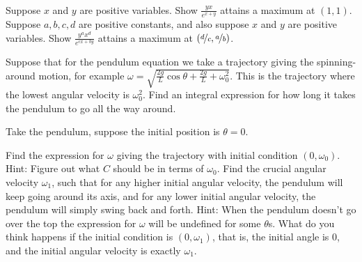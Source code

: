 \begin{exercise}
{\ }
\begin{tasks}
\task Suppose $x$ and $y$ are
positive variables.  Show $\frac{y x}{e^{x+y}}$
attains a maximum at $(1,1)$.
\task Suppose $a,b,c,d$ are positive constants, and also suppose $x$ and $y$ are
positive variables.  Show $\frac{y^a x^d}{e^{cx+by}}$
attains a maximum at $(\nicefrac{d}{c},\nicefrac{a}{b})$.
\end{tasks}
\end{exercise}

\begin{exercise}
Suppose that for the pendulum equation we take a trajectory giving the
spinning-around motion, for example $\omega = \sqrt{\frac{2g}{L} \cos \theta
+ \frac{2g}{L} + \omega_0^2}$.  This is the trajectory where the lowest
angular velocity is $\omega_0^2$.  Find an integral expression for how long it takes
the pendulum to go all the way around.
\end{exercise}


\begin{exercise}[challenging]
Take the pendulum, suppose the initial position is $\theta = 0$.
\begin{tasks}
\task
Find the expression for $\omega$ giving the trajectory
with initial condition $(0,\omega_0)$.  Hint: Figure out what $C$
should be in terms of $\omega_0$.
\task
Find the crucial angular velocity $\omega_1$, such that
for any higher initial angular velocity,
the pendulum will keep going around its
axis, and for any lower initial angular velocity, the pendulum will simply
swing back and forth.
Hint: When the pendulum doesn't go over the top the expression for $\omega$
will be undefined for some $\theta$s.
\task
What do you think happens if the initial condition is $(0,\omega_1)$,
that is, the initial angle is 0, and the initial angular velocity is exactly
$\omega_1$.
\end{tasks}
\end{exercise}

\setcounter{exercise}{100}

